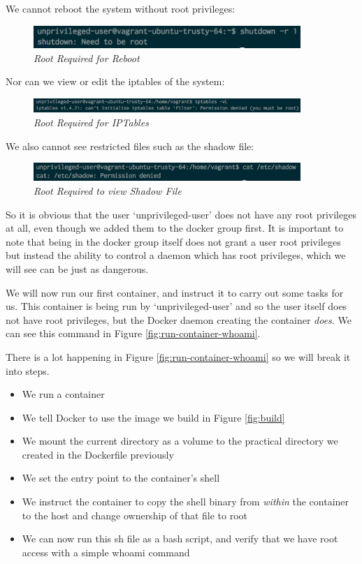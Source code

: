 \documentclass{article}
\begin{document}
We cannot reboot the system without root privileges:
\begin{figure}[!h]
\centering
\includegraphics*[width=0.9\textwidth]{components/images/non-root-reboot}
\caption{\em Root Required for Reboot}
\label{fig:non-root-reboot}
\end{figure}

Nor can we view or edit the iptables of the system:
\begin{figure}[!h]
\centering
\includegraphics*[width=0.9\textwidth]{components/images/non-root-iptables}
\caption{\em Root Required for IPTables}
\label{fig:non-root-iptables}
\end{figure}

We also cannot see restricted files such as the shadow file:
\begin{figure}[!h]
\centering
\includegraphics*[width=0.9\textwidth]{components/images/non-root-shadow}
\caption{\em Root Required to view Shadow File}
\label{fig:non-root-shadow}
\end{figure}

So it is obvious that the user `unprivileged-user' does not have any root privileges at all, even though we added them to the docker group first. It is important to note that being in the docker group itself does not grant a user root privileges but instead the ability to control a daemon which has root privileges, which we will see can be just as dangerous. 

We will now run our first container, and instruct it to carry out some tasks for us. This container is being run by `unprivileged-user' and so the user itself does not have root privileges, but the Docker daemon creating the container \textit{does}. We can see this command in Figure \ref{fig:run-container-whoami}.

There is a lot happening in Figure \ref{fig:run-container-whoami} so we will break it into steps. 

\begin{itemize}
  \item We run a container
  \item We tell Docker to use the image we build in Figure \ref{fig:build}
  \item We mount the current directory as a volume to the practical directory we created in the Dockerfile previously
  \item We set the entry point to the container's shell
  \item We instruct the container to copy the shell binary from \textit{within} the container to the host and change ownership of that file to root
  \item We can now run this sh file as a bash script, and verify that we have root access with a simple whoami command
\end{itemize}
\end{document}

